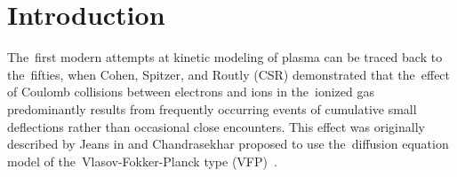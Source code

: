 \section{Introduction}
\label{sec:Intro}

The~first modern attempts at kinetic modeling of plasma can be traced back 
to the~fifties, when Cohen, Spitzer, and Routly (CSR) \cite{CSR_1950} 
demonstrated that the~effect of Coulomb collisions between electrons and ions 
in the~ionized gas predominantly results 
from frequently occurring events of cumulative small deflections 
rather than occasional close encounters. This effect was originally described
by Jeans in \cite{Jeans_BOOK1929} and 
Chandrasekhar \cite{Chandrasekhar_RMP1943} 
proposed to use the~diffusion equation model of the~Vlasov-Fokker-Planck type 
(VFP)~\cite{Planck_1917}.


